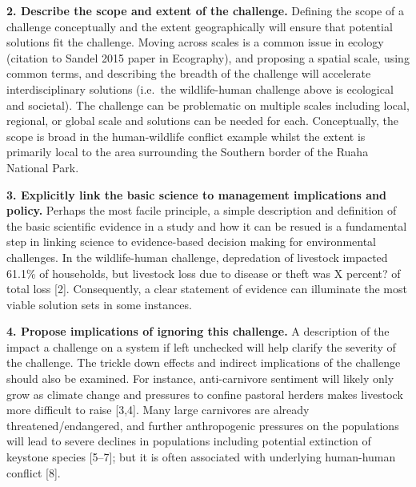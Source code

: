 \documentclass[10pt,letterpaper]{article}
\begin{document}
\textbf{2. Describe the scope and extent of the challenge.} Defining the
scope of a challenge conceptually and the extent geographically will
ensure that potential solutions fit the challenge. Moving across scales
is a common issue in ecology (citation to Sandel 2015 paper in
Ecography), and proposing a spatial scale, using common terms, and
describing the breadth of the challenge will accelerate
interdisciplinary solutions (i.e.~the wildlife-human challenge above is
ecological and societal). The challenge can be problematic on multiple
scales including local, regional, or global scale and solutions can be
needed for each. Conceptually, the scope is broad in the human-wildlife
conflict example whilst the extent is primarily local to the area
surrounding the Southern border of the Ruaha National Park.

\textbf{3. Explicitly link the basic science to management implications
and policy.} Perhaps the most facile principle, a simple description and
definition of the basic scientific evidence in a study and how it can be
resued is a fundamental step in linking science to evidence-based
decision making for environmental challenges. In the wildlife-human
challenge, depredation of livestock impacted 61.1\% of households, but
livestock loss due to disease or theft was X percent? of total loss
{[}2{]}. Consequently, a clear statement of evidence can illuminate the
most viable solution sets in some instances.

\textbf{4. Propose implications of ignoring this challenge.} A
description of the impact a challenge on a system if left unchecked will
help clarify the severity of the challenge. The trickle down effects and
indirect implications of the challenge should also be examined. For
instance, anti-carnivore sentiment will likely only grow as climate
change and pressures to confine pastoral herders makes livestock more
difficult to raise {[}3,4{]}. Many large carnivores are already
threatened/endangered, and further anthropogenic pressures on the
populations will lead to severe declines in populations including
potential extinction of keystone species {[}5--7{]}; but it is often
associated with underlying human-human conflict {[}8{]}.
\end{document}
